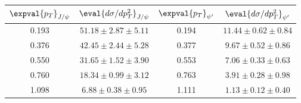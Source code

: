 \begin{tabular}{cc|cc}
\hline
$\expval{p_T}_{J/\psi}$    & $\eval{d\sigma/dp^2_T}_{J/\psi}$ & $\expval{p_T}_{\psi^\prime}$ & $\eval{d\sigma/dp^2_T}_{\psi^\prime}$\\ \hline
\multicolumn{1}{c|}{0.193} & $51.18\pm2.87\pm5.11$            & \multicolumn{1}{c|}{0.194}   & $11.44\pm0.62\pm0.84$                \\ 
\multicolumn{1}{c|}{0.376} & $42.45\pm2.44\pm5.28$            & \multicolumn{1}{c|}{0.377}   & $9.67\pm0.52\pm0.86$                 \\ 
\multicolumn{1}{c|}{0.550} & $31.65\pm1.52\pm3.90$            & \multicolumn{1}{c|}{0.553}   & $7.06\pm0.33\pm0.63$                 \\ 
\multicolumn{1}{c|}{0.760} & $18.34\pm0.99\pm3.12$            & \multicolumn{1}{c|}{0.763}   & $3.91\pm0.28\pm0.98$                 \\
\multicolumn{1}{c|}{1.098} & $6.88\pm0.38\pm0.95$             & \multicolumn{1}{c|}{1.111}   & $1.13\pm0.12\pm0.40$                 \\ \hline 
\end{tabular}
